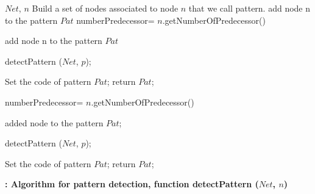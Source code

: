 \begin{algorithm}
\begin{algorithmic}[1]
\REQUIRE $Net$, $n$ 
\ENSURE Build a set of nodes associated to node $n$ that we call pattern.
   \STATE add node n to the pattern $Pat$
   \STATE numberPredecessor= $n$.getNumberOfPredecessor() %
   
      \STATE add node n to the pattern $Pat$
    \ENDCASE
    
      \STATE detectPattern ($Net$, $p$);
    \ENDCASE
    
    \ENDSWITCH
   \ENDFOR
      \STATE Set the code of pattern $Pat$;
      \STATE return $Pat$;
   \ENDCASE
   
     \STATE
     \ENDCASE
   \ENDSWITCH
\ENDCASE
   
   \STATE numberPredecessor= $n$.getNumberOfPredecessor() %
   
      \STATE added node to the pattern $Pat$;
    \ENDCASE
    
      \STATE detectPattern ($Net$, $p$);
    \ENDCASE
    
    \ENDSWITCH
   \ENDFOR
      \STATE Set the code of pattern $Pat$;
      \STATE return $Pat$;
   \ENDCASE
   
   \STATE
   \ENDCASE
   \ENDSWITCH
 \ENDCASE
\ENDSWITCH
\end{algorithmic}
\caption{\bf: Algorithm for pattern detection, function detectPattern ($Net$, $n$)} \label{PatternDetection}
\end{algorithm}



